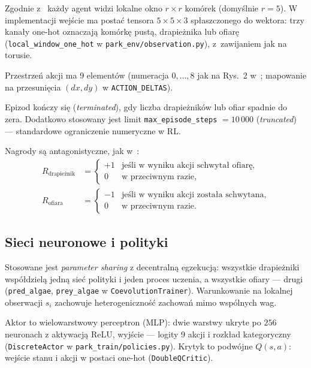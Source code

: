 \documentclass[polish]{template/projectreport}
\begin{document}
Zgodnie z~\cite{park2021} każdy agent widzi lokalne okno \(r \times r\) komórek (domyślnie \(r=5\)). W implementacji wejście ma postać tensora \(5\times 5\times 3\) spłaszczonego do wektora: trzy kanały one-hot oznaczają komórkę pustą, drapieżnika lub ofiarę (\texttt{local\_window\_one\_hot} w \texttt{park\_env/observation.py}), z~zawijaniem jak na torusie.

Przestrzeń akcji ma 9 elementów (numeracja \(0,\ldots,8\) jak na Rys.~2 w~\cite{park2021}; mapowanie na przesunięcia \((dx,dy)\) w \texttt{ACTION\_DELTAS}).

Epizod kończy się (\emph{terminated}), gdy liczba drapieżników lub ofiar spadnie do zera. Dodatkowo stosowany jest limit \texttt{max\_episode\_steps} \(=10\,000\) (\emph{truncated}) --- standardowe ograniczenie numeryczne w RL.

Nagrody są antagonistyczne, jak w~\cite{park2021}:
\begin{align}
\label{eq:nagrody-pred}
R_{\text{drapieżnik}} &=
  \begin{cases}
    +1 & \text{jeśli w wyniku akcji schwytał ofiarę,} \\
    0  & \text{w przeciwnym razie,}
  \end{cases} \\
\label{eq:nagrody-prey}
R_{\text{ofiara}} &=
  \begin{cases}
    -1 & \text{jeśli w wyniku akcji została schwytana,} \\
    0  & \text{w przeciwnym razie.}
  \end{cases}
\end{align}

\subsection{Sieci neuronowe i polityki}
\label{sec:sieci}

Stosowane jest \emph{parameter sharing} z decentralną egzekucją: wszystkie drapieżniki współdzielą jedną sieć polityki i jeden proces uczenia, a wszystkie ofiary --- drugi (\texttt{pred\_algae}, \texttt{prey\_algae} w \texttt{CoevolutionTrainer}). Warunkowanie na lokalnej obserwacji \(s_i\) zachowuje heterogeniczność zachowań mimo wspólnych wag.

Aktor to wielowarstwowy perceptron (MLP): dwie warstwy ukryte po \(256\) neuronach z aktywacją ReLU, wyjście --- logity 9 akcji i rozkład kategoryczny (\texttt{DiscreteActor} w \texttt{park\_train/policies.py}). Krytyk to podwójne \(Q(s,a)\): wejście stanu i akcji w postaci one-hot (\texttt{DoubleQCritic}).
\end{document}
